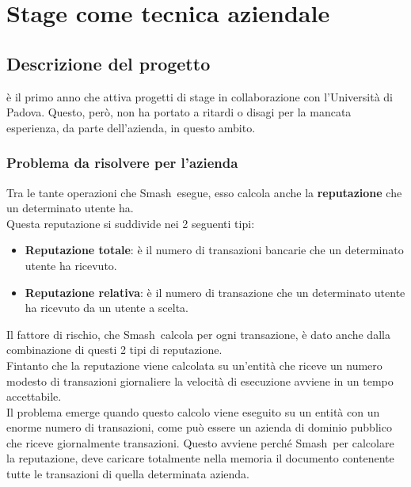 
\chapter{Stage come tecnica aziendale}
\label{cap:tecnica-stage}

\section{Descrizione del progetto}
\label{sec:prob}
\textit{\azienda} è il primo anno che attiva progetti di stage in collaborazione con l'Università di Padova. Questo, però, non ha portato a ritardi o disagi per la mancata esperienza, da parte dell'azienda, in questo ambito. 
\subsection{Problema da risolvere per l'azienda}
Tra le tante operazioni che Smash\textregistered\ esegue, esso calcola anche la \textbf{reputazione} che un determinato utente ha.\\
Questa reputazione si suddivide nei 2 seguenti tipi:
\begin{itemize}
\item{\textbf{Reputazione totale}:} è il numero di transazioni bancarie che un determinato utente ha ricevuto.
\item{\textbf{Reputazione relativa}:} è il numero di transazione che un determinato utente ha ricevuto da un utente a scelta.
\end{itemize}
Il fattore di rischio, che Smash\textregistered\ calcola per ogni transazione, è dato anche dalla combinazione di questi 2 tipi di reputazione.\\
Fintanto che la reputazione viene calcolata su un'entità che riceve un numero modesto di transazioni giornaliere la velocità di esecuzione avviene in un tempo accettabile. 
\\Il problema emerge quando questo calcolo viene eseguito su un entità con un enorme numero di transazioni, come può essere un azienda di dominio pubblico che riceve giornalmente transazioni. Questo avviene perché Smash\textregistered\, per calcolare la reputazione, deve caricare totalmente nella memoria il documento contenente tutte le transazioni di quella determinata azienda.
